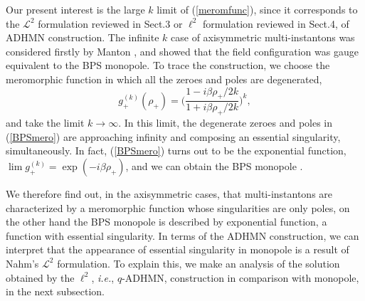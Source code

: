 \documentclass[a4paper,10pt]{article}
\newcommand{\ie}{\textit{i.e.}}
\begin{document}
Our present interest is the large $k$ limit of (\ref{meromfunc}), since it corresponds to the $\mathcal{L}^2$ formulation reviewed in Sect.3 or $\ell^2$ formulation reviewed in Sect.4, of ADHMN construction.
The infinite $k$ case of axisymmetric multi-instantons was considered firstly by Manton \cite{Mant}, and showed that the field configuration was gauge equivalent to the BPS monopole.
To trace the construction, we choose the meromorphic function in which all the zeroes and poles are degenerated,
\begin{equation}
g^{(k)}_+(\rho_+)=\Biggl(\frac{1-{i\beta \rho_+}/{2k}}{1+{i\beta \rho_+}/{2k}}\Biggr)^k, \label{BPSmero}
\end{equation}
and take the limit $k\to\infty$.
In this limit, the degenerate zeroes and poles in (\ref{BPSmero}) are approaching infinity and composing an essential singularity, simultaneously.
In fact, (\ref{BPSmero}) turns out to be the exponential function, $\lim g^{(k)}_+=\exp(-i\beta \rho_+)$, and we can obtain the BPS monopole \cite{Mant}.


We therefore find out, in the axisymmetric cases, that  multi-instantons are characterized by a meromorphic function whose singularities are only poles, on the other hand the BPS monopole is described by exponential function, a function with essential singularity.
In terms of the ADHMN construction, we can interpret that the appearance of essential singularity in monopole is a result of Nahm's $\mathcal{L}^2$ formulation.
To explain this, we make an analysis of the solution obtained by the $\ell^2$, \ie, $q$-ADHMN, construction in comparison with monopole, in the next subsection. 
\end{document}
